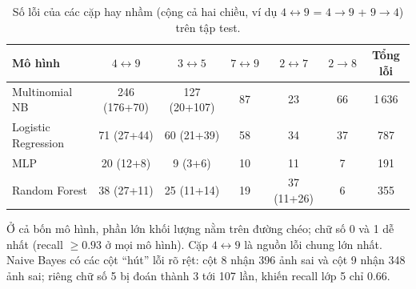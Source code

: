 \begin{table}[H]
\centering\small
\caption{Số lỗi của các cặp hay nhầm (cộng cả hai chiều, ví dụ $4\leftrightarrow9$ = $4\to9$ + $9\to4$) trên tập test.}\label{tab:pairs}
\begin{tabular}{@{}lcccccc@{}}
\toprule
Mô hình & $4\leftrightarrow9$ & $3\leftrightarrow5$ & $7\leftrightarrow9$ & $2\leftrightarrow7$ & $2\to8$ & Tổng lỗi \\
\midrule
Multinomial NB      & 246 (176+70) & 127 (20+107) & 87 & 23 & 66 & 1\,636 \\
Logistic Regression & 71 (27+44)   & 60 (21+39)   & 58 & 34 & 37 & 787 \\
MLP                 & 20 (12+8)    & 9 (3+6)      & 10 & 11 & 7  & 191 \\
Random Forest       & 38 (27+11)   & 25 (11+14)   & 19 & 37 (11+26) & 6 & 355 \\
\bottomrule
\end{tabular}
\end{table}
 
Ở cả bốn mô hình, phần lớn khối lượng nằm trên đường chéo; chữ số 0 và 1 dễ nhất (recall $\ge0.93$ ở mọi mô hình). Cặp $4\leftrightarrow9$ là nguồn lỗi chung lớn nhất. Naive Bayes có các cột ``hút'' lỗi rõ rệt: cột 8 nhận 396 ảnh sai và cột 9 nhận 348 ảnh sai; riêng chữ số 5 bị đoán thành 3 tới 107 lần, khiến recall lớp 5 chỉ 0.66.